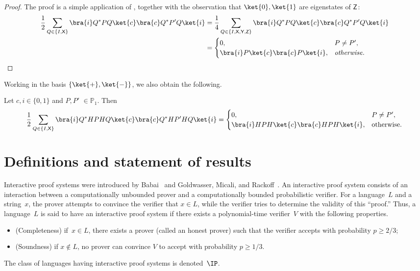 \documentclass{toc}
\newcommand{\xgate}{{\sf X}}
\newcommand{\ygate}{{\sf Y}}
\newcommand{\zgate}{{\sf Z}}
\begin{document}
\begin{proof}
The proof is a simple application of ,
together with the observation that $\ket{0}, \ket{1}$ are eigenstates
of $\zgate$:
\begin{align}
%
\frac{1}{2}\sum_{Q \in \{I, \xgate\}} \bra{i}  Q^* P Q \ket{c}\bra{c} Q^* P' Q \ket{i} &=
\frac{1}{4} \sum_{Q \in \{I, \xgate, \ygate, \zgate \}}   \bra{i}  Q^* P Q \ket{c}\bra{c} Q^* P' Q \ket{i}\\
&=\begin{cases}
 0,& P \neq P',\\
%
%
%
%
%
\bra{i} P\ket{c}\bra{c} P \ket{i},& \text{\emph{otherwise}}.
\end{cases}
\end{align}
\end{proof}
Working in the basis $\{\ket{+}, \ket{-}\}$, we also
%
obtain the following. 
%
%
\begin{lemma}\label{lem:classical-Pauli-twirl-Z} Let $c,i \in \{0,1\}$ and $P, P'$  $\in \mathbb{P}_1$. Then %
\begin{equation}\frac{1}{2} \sum_{Q \in \{I, \xgate\}} \bra{i}  Q^*H P H Q \ket{c}\bra{c} Q^*H P'H Q \ket{i} =
 \begin{cases}
 0, & P \neq P',\\
\bra{i} H  P H \ket{c}\bra{c}H  P H\ket{i},& \text{otherwise}.
  \end{cases}
    \end{equation}
\end{lemma}








\section{Definitions and statement of results}
\label{sec:QPIP-definitions}



Interactive proof systems were introduced by Babai~\cite{Bab85} and Goldwasser, Micali,
and Rackoff~\cite{GMR89}. An interactive proof system consists of an interaction between a
computationally unbounded prover and a computationally bounded probabilistic verifier.
For a language~$L$ and a string~$x$, the prover attempts to convince the verifier that $x \in L$,
while the verifier tries to determine the validity of this ``proof.''
Thus, a language~$L$ is said to have an interactive proof system if
there exists a polynomial-time verifier~$V$
%
with the following properties.  %
\begin{itemize}
 \item (Completeness) if~$x \in L$, there exists a prover (called an honest prover) such that the verifier accepts with probability $p \geq {2}/{3}$;
 \item (Soundness) if $x \not\in L$, no prover can convince $V$ to accept with probability $p \geq 1/3$.
 \end{itemize}
The class of languages having interactive proof systems is denoted~$\IP$.
\end{document}

